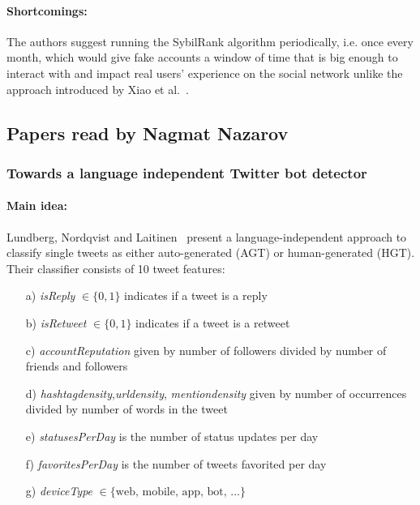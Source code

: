 \paragraph{Shortcomings:}
The authors suggest running the SybilRank algorithm periodically, i.e. once every month, which would give fake accounts a window of time that is big enough to interact with and impact real users' experience on the social network unlike the approach introduced by Xiao et al.~\cite{xiao2015detecting}.

\subsection{Papers read by Nagmat Nazarov}



\subsubsection{Towards a language independent Twitter bot detector}

\paragraph{Main idea:}
Lundberg, Nordqvist and Laitinen~\cite{lundberg2019towards} present a language-independent approach to classify single tweets as either auto-generated (AGT) or human-generated (HGT). Their classifier consists of 10 tweet features:
\begin{itemize}
    \item[a)] \emph{isReply} $\in \{ 0,1 \}$ indicates if a tweet is a reply
    \item[b)] \emph{isRetweet} $\in \{ 0,1 \}$ indicates if a tweet is a retweet
    \item[c)] \emph{accountReputation} given by number of followers divided by number of friends and followers
    \item[d)] \emph{hashtagdensity},\emph{urldensity}, \emph{mentiondensity} given by number of occurrences divided by number of words in the tweet
    \item[e)] \emph{statusesPerDay} is the number of status updates per day
    \item[f)] \emph{favoritesPerDay} is the number of tweets favorited per day
    \item[g)] \emph{deviceType} $\in \{ \text{web, mobile, app, bot, ...} \}$
\end{itemize}

